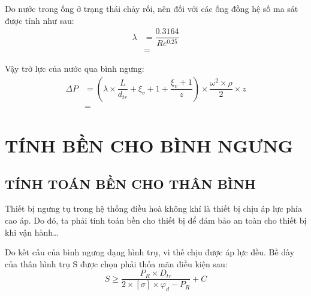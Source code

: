 Do nước trong ống ở trạng thái chảy rối, nên đối với các ống đồng hệ số ma sát được tính như sau:
\begin{equation*}
	\begin{split}
		\lambda &= \dfrac{0.3164}{Re^{0.25}}\\
		&=  
	\end{split}
\end{equation*}

Vậy trở lực của nước qua bình ngưng:
\begin{equation*}
	\begin{split}
		\Delta P &= \left(\lambda\times\dfrac{L}{d_{tr}} +\xi_{v} + 1 + \dfrac{\xi_{v} + 1}{z}\right)\times \dfrac{\omega^2\times\rho}{2}\times z\\
		&=  
	\end{split}
\end{equation*}

\section{TÍNH BỀN CHO BÌNH NGƯNG}
\subsection{TÍNH TOÁN BỀN CHO THÂN BÌNH}
Thiết bị ngưng tụ trong hệ thống điều hoà không khí là thiết bị chịu áp lực phía cao áp. Do đó, ta phải tính toán bền cho thiết bị để đảm bảo an toàn cho thiết bị khi vận hành…

Do kết cấu của bình ngưng dạng hình trụ, vì thế chịu được áp lực đều. Bề dày của thân hình trụ S được chọn phải thỏa mãn điều kiện sau:
\begin{equation*}
	S \geq \dfrac{P_{R}\times D_{tr}}{2\times [\sigma]\times\varphi_{d} - P_{R}} + C
\end{equation*}

